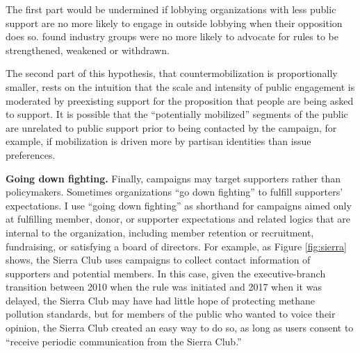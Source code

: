 \begin{subhyp}
The first part would be undermined if lobbying organizations with less public support are no more likely to engage in outside lobbying when their opposition does so. \citet{Potter2017} found industry groups were no more likely to advocate for rules to be strengthened, weakened or withdrawn. 

The second part of this hypothesis, that countermobilization is proportionally smaller, rests on the intuition that the scale and intensity of public engagement is moderated by preexisting support for the proposition that people are being asked to support. It is possible that the ``potentially mobilized'' segments of the public are unrelated to public support prior to being contacted by the campaign, for example, if mobilization is driven more by partisan identities than issue preferences.

\textbf{Going down fighting.} Finally, campaigns may target supporters rather than policymakers. Sometimes organizations ``go down fighting'' to fulfill supporters' expectations.
I use ``going down fighting'' as shorthand for campaigns aimed only at fulfilling member, donor, or supporter expectations and related logics that are internal to the organization, including member retention or recruitment, fundraising, or satisfying a board of directors. For example, as Figure \ref{fig:sierra} shows, the Sierra Club uses campaigns to collect contact information of supporters and potential members. In this case, given the executive-branch transition between 2010 when the rule was initiated and 2017 when it was delayed, the Sierra Club may have had little hope of protecting methane pollution standards, but for members of the public who wanted to voice their opinion, the Sierra Club created an easy way to do so, as long as users consent to ``receive periodic communication from the Sierra Club.'' 


\end{subhyp}
